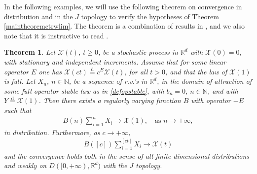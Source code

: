 \documentclass[reqno]{amsart}
\newtheorem{theorem}{Theorem}[section] %
\theoremstyle{remark}
\numberwithin{equation}{section} %
\newcommand{\RR}{\mathbb{R}}
\newcommand{\NN}{\mathbb{N}}
\newcommand{\1}{\mathds{1}}
\begin{document}
	In the following examples, we will use the following theorem on convergence in distribution and in the $J$ topology to verify the hypotheses of Theorem \ref{maintheoremctrwlim}. The theorem is a combination of results in \cite{meerschaert2001limit, Meerschaert2004}, and we also note that it is instructive to read \cite[Example 11.2.18]{meerschaert2001limit}.
	\begin{theorem}
		\label{theoremforexamples}
		Let $\mathcal{X}(t)$, $t \geq0$, be a stochastic process in $\RR^d$ with $\mathcal{X}(0) =0$, with stationary and independent increments. Assume that for some linear operator $E$ one has $\mathcal{X}(ct)\stackrel{\text{d}}{=} c^E\mathcal{X}(t)$, for all $t>0$, and that the law of $\mathcal{X}(1)$ is full. Let $X_n$, $n\in\NN$, be a sequence of r.v.'s in $\mathbb{R}^d$, in the domain of attraction of some full operator stable law as in \eqref{defopstable}, with $b_n=0$, $n\in \NN$, and with $Y \stackrel{\text{d}}{=}\mathcal{X}(1)$. Then there exists a regularly varying function $B$ with operator $-E$ such that
		\begin{align}\label{1351claim}
			B(n) \sum_{i=1}^n X_i \to \mathcal{X}(1),\quad \text{as $n\to+\infty,$}  
		\end{align}
		in distribution.
		Furthermore, as $c \to +\infty$,
		\begin{align}
			B([c]) \sum_{i=1}^{[ct]} X_i \to  \mathcal{X}(t)
		\end{align}
		and the convergence holds both in the sense of all finite-dimensional distributions and weakly on $D([0, +\infty), \mathbb{R}^d)$ with the $J$ topology.
	\end{theorem}
\end{document}
